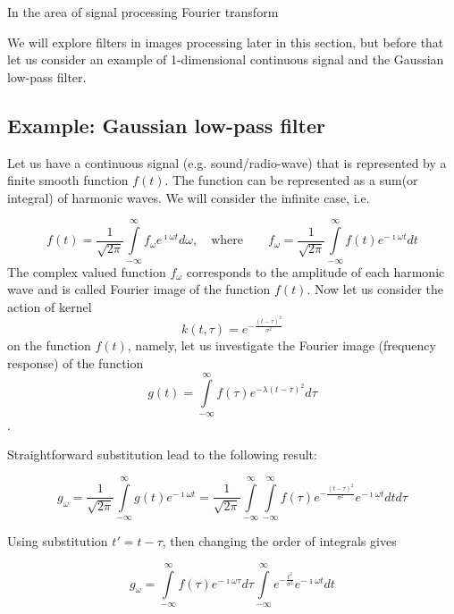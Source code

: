\documentclass[11pt]{book}
\begin{document}
In the area of signal processing Fourier transform

 We will explore filters in images processing later in this section, but before that let us consider an example of 1-dimensional continuous signal and the Gaussian low-pass filter. 

\subsection{Example: Gaussian low-pass filter}

Let us have a continuous signal (e.g. sound/radio-wave) that is represented by a finite smooth function $f(t)$. The function can be represented as a sum(or integral) of harmonic waves. We will consider the infinite case, i.e.

\begin{equation}
f(t) = \frac{1}{\sqrt{2\pi}}\int\limits_{-\infty}^\infty f_{\omega} e^{\imath\omega t} d\omega,\quad \text{where} \qquad f_{\omega} =\frac{1}{\sqrt{2\pi}} \int\limits_{-\infty}^\infty f(t) e^{-\imath\omega t} dt
\end{equation}      
The complex valued function $f_{\omega}$ corresponds to the amplitude of each harmonic wave and is called Fourier image of the function $f(t)$.
Now let us consider the action of kernel 
\begin{equation}
k(t,\tau) = e^{-\frac{(t-\tau)^2}{\sigma^2}}
\end{equation}
 on the function $f(t)$, namely, let us investigate the Fourier image (frequency response) of the function
\begin{equation}
g(t) = \int\limits_{-\infty}^\infty f(\tau)e^{-\lambda(t-\tau)^2} d\tau 
\end{equation}.

Straightforward substitution lead to the following result:

\begin{equation}
g_\omega = \frac{1}{\sqrt{2\pi}} \int\limits_{-\infty}^\infty g(t) e^{-\imath\omega t} = \frac{1}{\sqrt{2\pi}} \int\limits_{-\infty}^\infty \int\limits_{-\infty}^\infty f(\tau)e^{-\frac{(t-\tau)^2}{\sigma^2}} e^{-\imath\omega t }dt d\tau 
\end{equation}

Using substitution $t' = t - \tau$, then changing the order of integrals gives

\begin{equation}
g_\omega = \int\limits_{-\infty}^\infty f(\tau) e^{-\imath\omega \tau}d\tau \int\limits_{-\infty}^\infty e^{-\frac {t^2}{\sigma^2}} e^{-\imath\omega t }dt
\end{equation}
\end{document}
